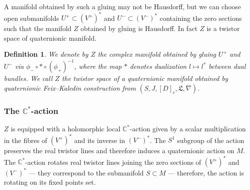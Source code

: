 \documentclass{amsart}
\newtheorem{defi}{Definition}[section]
\begin{document}
A manifold obtained by such a gluing may not be Hausdorff, but we can choose open submanifolds $U^+\subset (V^+)^*$ and $U^-\subset (V^-)^*$ containing the zero sections such that the manifold $Z$  obtained by gluing is Hausdorff. In fact $Z$ is a twistor space of quaternionic manifold.
\begin{defi}
    We denote by $Z$
 the complex manifold obtained by gluing $U^+$ and $U^-$ via $\phi_-\circ *\circ(\phi_+)^{-1}$, where the map $*$ denotes dualization $l\mapsto l^*$ between dual bundles. We call $Z$ the twistor space of a quaternionic manifold obtained by quaternionic Feix--Kaledin construction from $(S,J,[D]_c,\mathfrak{L},\nabla)$.
 \end{defi}
\subsubsection{The $\mathbb{C}^*$-action} $Z$ is equipped with a holomorphic local $\mathbb{C}^*$-action given by a scalar multiplication in the fibres of $ (V^+)^*$ and  its inverse in $(V^-)^*$. The $S^1$ subgroup of the action preserves the real twistor lines and therefore induces a quaternionic action on $M$. The $\mathbb{C}^* $-action rotates real twistor lines joining the zero sections of $ (V^+)^*$ and $(V^-)^*$  --- they correspond to the submanifold $S\subset M$ --- therefore, the action is rotating on its fixed points set.
\end{document}
